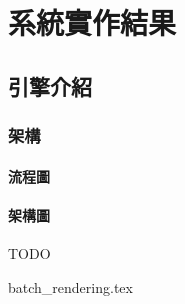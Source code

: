 \chapter{系統實作結果}

\section{引擎介紹}

\subsection{架構}
\label{sub:架構}

\subsubsection{流程圖} %
\label{ssub:流程圖}



\subsubsection{架構圖} %
\label{ssub:架構圖}
TODO


{batch_rendering.tex}


\newpage